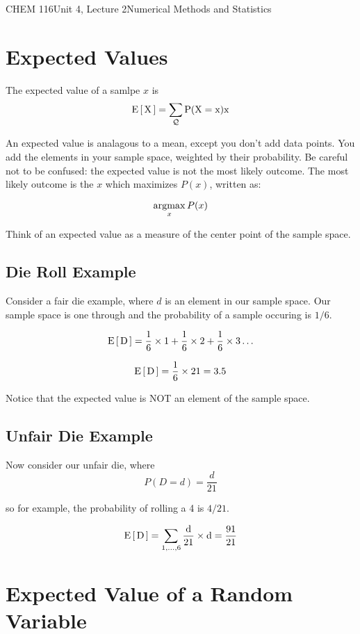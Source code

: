 \documentclass{article}
\begin{document}
\begin{tdoc}{CHEM 116}{Unit 4, Lecture 2}{Numerical Methods and Statistics}

\section{Expected Values}

The expected value of a samlpe $x$ is
\begin{equation}
\rm{E}\left[\,X\,\right] = \sum_\mathcal{Q} P(X=x)x
\end{equation}

An expected value is analagous to a mean, except you don't add data
points. You add the elements in your sample space, weighted by their
probability. Be careful not to be confused: the expected value is not
the most likely outcome. The most likely outcome is the $x$ which
maximizes $P(x)$, written as:

\begin{equation}
\operatorname*{argmax}_x P(x)
\end{equation}

Think of an expected value as a measure of the center point of the sample space. 

\subsection{Die Roll Example}

Consider a fair die example, where $d$ is an element in our sample
space. Our sample space is one through and the probability of a sample
occuring is $1/6$. 

\[
\rm{E}\left[\,D\,\right] = \frac{1}{6}\times{}1 + \frac{1}{6}\times{}2 + \frac{1}{6}\times{}3 \ldots
\]

\[
\rm{E}\left[\,D\,\right] = \frac{1}{6}\times 21 = 3.5
\]

Notice that the expected value is NOT an element of the sample space.

\subsection{Unfair Die Example}
Now consider our unfair die, where
\[
P(D = d) = \frac{d}{21}
\]

so for example, the probability of rolling a 4 is $4/21$.

\[
\rm{E}\left[\,D\,\right] = \sum_{1,\ldots,6} \frac{d}{21} \times d = \frac{91}{21}
\]

\section{Expected Value of a Random Variable}


\end{tdoc}
\end{document}
